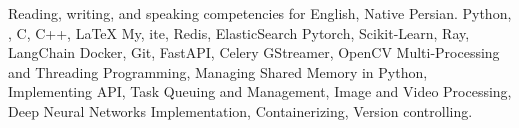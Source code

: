 
\begin{rubric}{}
\entry*[Languages]
	  Reading, writing, and speaking competencies for English, Native Persian.
	  Python, , C, C++, \LaTeX
\entry*[Databases]
	My, ite, Redis, ElasticSearch
\entry*[ML Frameworks]
	Pytorch, Scikit-Learn, Ray, LangChain
        Docker, Git, FastAPI, Celery
        GStreamer, OpenCV
\entry*[Misc.]
	Multi-Processing and Threading Programming, Managing Shared Memory in Python, Implementing API, Task Queuing and Management, Image and Video Processing, Deep Neural Networks Implementation, Containerizing, Version controlling.
\end{rubric}
